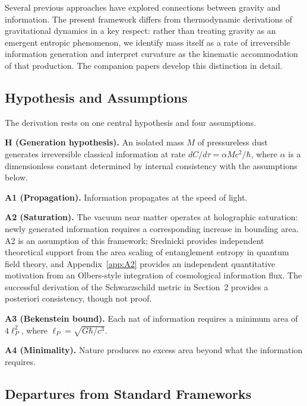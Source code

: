 \documentclass[12pt]{article}
\begin{document}
Several previous approaches have explored connections between gravity
and information.
The present framework differs from thermodynamic derivations of
gravitational dynamics in a key respect: rather than treating gravity
as an emergent entropic phenomenon, we identify mass itself as a rate
of irreversible information generation and interpret curvature as the
kinematic accommodation of that production.
The companion papers develop this distinction in detail.

\subsection{Hypothesis and Assumptions}
\label{sec:hypothesis}

The derivation rests on one central hypothesis and four assumptions.

\medskip
\noindent\textbf{H (Generation hypothesis).}
An isolated mass $M$ of pressureless dust generates irreversible
classical information at rate
$dC/d\tau = \alpha Mc^2/\hbar$,
where $\alpha$ is a dimensionless constant determined by internal
consistency with the assumptions below.

\medskip
\noindent\textbf{A1 (Propagation).}
Information propagates at the speed of light.

\medskip
\noindent\textbf{A2 (Saturation).}
The vacuum near matter operates at holographic saturation: newly
generated information requires a corresponding increase in bounding
area.
A2 is an assumption of this framework; Srednicki \cite{Srednicki1993}
provides independent theoretical support from the area scaling of
entanglement entropy in quantum field theory, and Appendix~\ref{app:A2}
provides an independent quantitative motivation from an Olbers-style
integration of cosmological information flux.
The successful derivation of the Schwarzschild metric in Section~2
provides a posteriori consistency, though not proof.

\medskip
\noindent\textbf{A3 (Bekenstein bound).}
Each nat of information requires a minimum area of $4\ell_P^2$, where
$\ell_P = \sqrt{G\hbar/c^3}$.

\medskip
\noindent\textbf{A4 (Minimality).}
Nature produces no excess area beyond what the information requires.

\subsection{Departures from Standard Frameworks}
\label{sec:departures}
\end{document}
